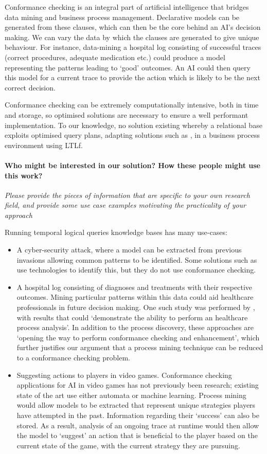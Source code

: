 Conformance checking is an integral part of artificial intelligence that bridges data mining and business process management. Declarative models can be generated from these clauses, which can then be the core behind an AI's decision making. We can vary the data by which the clauses are generated to give unique behaviour. For instance, data-mining a hospital log consisting of successful traces (correct procedures, adequate medication etc.) could produce a model representing the patterns leading to `good' outcomes. An AI could then query this model for a current trace to provide the action which is likely to be the next correct decision.

Conformance checking can be extremely computationally intensive, both in time and storage, so optimised solutions are necessary to ensure a well performant implementation. To our knowledge, no solution existing whereby a relational base exploits optimised query plans, adapting solutions such as \cite{BellatrecheKB21}, in a business process environment using LTLf.
\medskip

\paragraph*{Who might be interested in our solution? How these people might use this work?} \textit{Please provide the pieces of information that are specific to your own research field, and provide some use case examples motivating the practicality of your approach}  

Running temporal logical queries knowledge bases has many use-cases:
\begin{itemize}
	\item A cyber-security attack, where a model can be extracted from previous invasions allowing common patterns to be identified. Some solutions such as \cite{BENASHER201551} use technologies to identify this, but they do not use conformance checking. 
	\item A hospital log consisting of diagnoses and treatments with their respective outcomes. Mining particular patterns within this data could aid healthcare professionals in future decision making. One such study was performed by \cite{Amantea2020}, with results that could `demonstrate the ability to perform an healthcare process analysis'. In addition to the process discovery, these approaches are `opening the way to perform conformance checking and enhancement', which further justifies our argument that a process mining technique can be reduced to a conformance checking problem.
	\item Suggesting actions to players in video games. Conformance checking applications for AI in video games has not previously been research; existing state of the art \cite{Miyake2017} use either automata or machine learning. Process mining would allow models to be extracted that represent unique strategies players have attempted in the past. Information regarding their `success' can also be stored. As a result, analysis of an ongoing trace at runtime would then allow the model to `suggest' an action that is beneficial to the player based on the current state of the game, with the current strategy they are pursuing.
\end{itemize}

